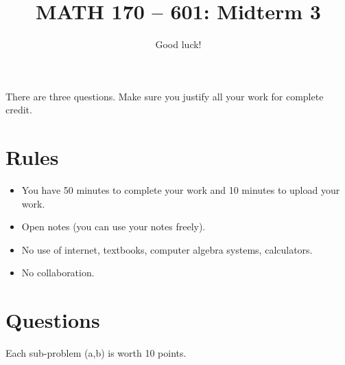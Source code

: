 \documentclass[12pt]{amsart}
\title{ MATH 170 -- 601: Midterm 3 }
\author{Good luck!}
\date{}
\begin{document}
\maketitle

There are three questions. Make sure you justify all your work for complete credit.

\section*{Rules}

\begin{itemize}[leftmargin=*]
    \item You have 50 minutes to complete your work and 10 minutes to upload your work.
    \item Open notes (you can use your notes freely).
    \item No use of internet, textbooks, computer algebra systems, calculators. 
    \item No collaboration.
\end{itemize}

\section*{Questions}
Each sub-problem (a,b) is worth 10 points.
\end{document}
